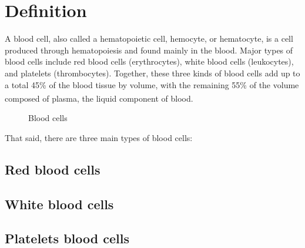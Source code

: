 \section{Definition}
\vspace{0.2in}
\hspace*{0.16in}

A blood cell, also called a hematopoietic cell, hemocyte, or hematocyte, is a cell produced through hematopoiesis and found mainly in the blood. Major types of blood cells include red blood cells (erythrocytes), white blood cells (leukocytes), and platelets (thrombocytes). Together, these three kinds of blood cells add up to a total 45\% of the blood tissue by volume, with the remaining 55\% of the volume composed of plasma, the liquid component of blood. \textsuperscript{\cite{hopkins1993human}}\\

\vspace{0.1in}

\begin{figure}[h]
\centering
  \vspace{-0.1in}
    \centerline{}
    \caption{Blood cells}
\end{figure}

That said, there are three main types of blood cells:

\subsection{Red blood cells}
\vspace{0.1in}
\hspace*{0.16in}


\subsection{White blood cells}
\vspace{0.1in}
\hspace*{0.16in}


\subsection{Platelets blood cells}
\vspace{0.1in}
\hspace*{0.16in}
